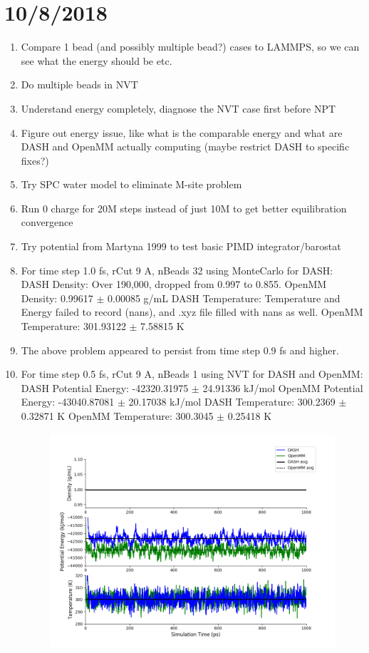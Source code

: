 \documentclass[12pt,reqno]{amsart}
\numberwithin{equation}{section}
\begin{document}
\section{10/8/2018}
\begin{enumerate}
\item Compare 1 bead (and possibly multiple bead?) cases to LAMMPS, so we can see what the energy should be etc.  
\item Do multiple beads in NVT
\item Understand energy completely, diagnose the NVT case first before NPT
\item Figure out energy issue, like what is the comparable energy and what are DASH and OpenMM actually computing (maybe restrict DASH to specific fixes?)
\item Try SPC water model to eliminate M-site problem
\item Run 0 charge for 20M steps instead of just 10M to get better equilibration convergence 
\item Try potential from Martyna 1999 to test basic PIMD integrator/barostat 
\item For time step 1.0 fs, rCut 9 A, nBeads 32 using MonteCarlo for DASH:
\subitem DASH Density: Over 190,000, dropped from 0.997 to 0.855.  
\subitem OpenMM Density: 0.99617 $\pm$ 0.00085 g/mL
\subitem DASH Temperature: Temperature and Energy failed to record (nans), and .xyz file filled with nans as well.  
\subitem OpenMM Temperature:  301.93122 $\pm$ 7.58815 K
\item The above problem appeared to persist from time step 0.9 fs and higher. 

\item For time step 0.5 fs, rCut 9 A, nBeads 1 using NVT for DASH and OpenMM:
\subitem DASH Potential Energy: -42320.31975 $\pm$ 24.91336 kJ/mol
\subitem OpenMM Potential Energy: -43040.87081 $\pm$ 20.17038 kJ/mol
\subitem DASH Temperature: 300.2369 $\pm$ 0.32871  K
\subitem OpenMM Temperature: 300.3045 $\pm$ 0.25418 K
\begin{figure}[H]
\centering
\includegraphics[scale=0.7]{MC-MM-NVT-1bead}
\end{figure} 


\end{enumerate}
\end{document}
